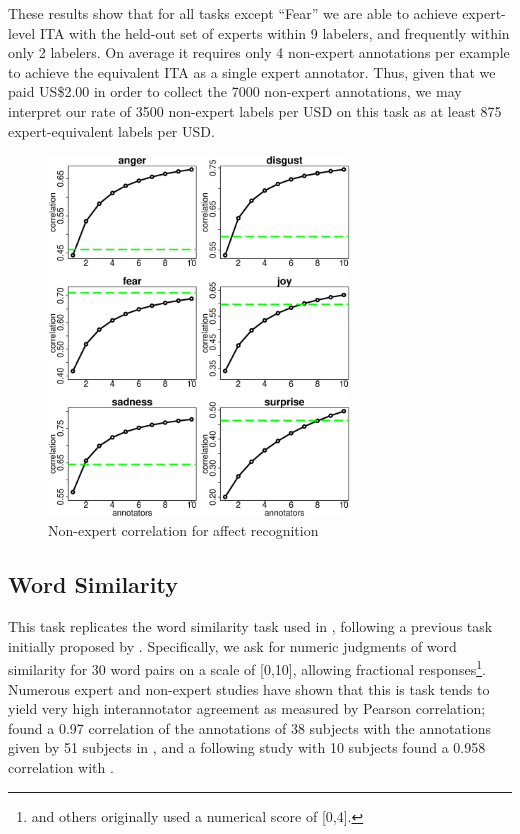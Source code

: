\documentclass[11pt]{article}
\begin{document}
These results show that for all tasks except ``Fear'' we are able to achieve expert-level ITA with the held-out set of experts within 9 labelers, and frequently within only 2 labelers.  On average it requires only 4 non-expert annotations per example to achieve the equivalent ITA as a single expert annotator. Thus, given that we paid US\$2.00 in order to collect the 7000 non-expert annotations, we may interpret our rate of 3500 non-expert labels per USD on this task as at least 875 expert-equivalent labels per USD.

\begin{figure}[ht]
\centering
\includegraphics[width=8cm]{figures/all_emo.eps}
\caption{Non-expert correlation for affect recognition } \label{affITAfigure}
\end{figure}
\vspace*{-0.1in}

\subsection{ Word Similarity }

This task replicates the word similarity task used in \cite{MC}, following a previous task initially proposed by \cite{RG}.  Specifically, we ask for numeric judgments of word similarity for 30 word pairs on a scale of [0,10], allowing fractional responses\footnote{\cite{MC} and others originally used a numerical score of [0,4].}. Numerous expert and non-expert studies have shown that this is task tends to yield very high interannotator agreement as measured by Pearson correlation; \cite{MC} found a 0.97 correlation of the annotations of 38 subjects with the annotations given by 51 subjects in \cite{RG}, and a following study \cite{Resnik:99} with 10 subjects found a 0.958 correlation with \cite{MC}.
\end{document}
